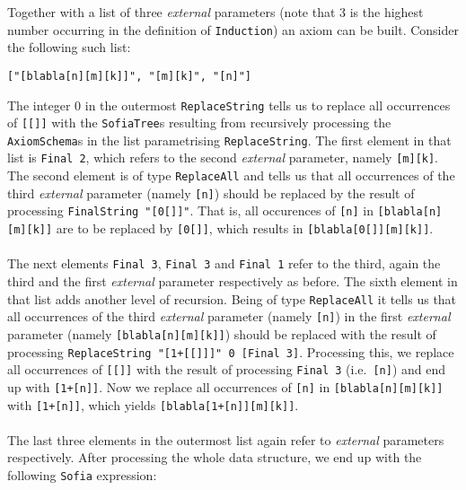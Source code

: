 \documentclass[notitlepage]{report}
\newcommand\m[1]{\texttt{#1}}
\begin{document}
Together with a list of three \emph{external} parameters (note that 3 is the
highest number occurring in the definition of \texttt{Induction}) an axiom can
be built. Consider the following such list:
\begin{verbatim}
["[blabla[n][m][k]]", "[m][k]", "[n]"]
\end{verbatim}

The integer 0 in the outermost \m{ReplaceString} tells us to replace all
occurrences of \texttt{[[]]} with the \m{SofiaTree}s resulting from recursively
processing the \m{AxiomSchema}s in the list parametrising \m{ReplaceString}. The
first element in that list is \m{Final 2}, which refers to the second
\emph{external} parameter, namely \texttt{[m][k]}. The second element is of type
\m{ReplaceAll} and tells us that all occurrences of the third \emph{external}
parameter (namely \texttt{[n]}) should be replaced by the result of processing
\m{FinalString "[0[]]"}. That is, all occurences of \texttt{[n]} in
\texttt{[blabla[n][m][k]]} are to be replaced by \texttt{[0[]]}, which results
in \texttt{[blabla[0[]][m][k]]}.
\\\\
The next elements \m{Final 3}, \m{Final 3} and \m{Final 1} refer to the
third, again the third and the first \emph{external} parameter respectively as
before. The sixth element in that list adds another level of recursion. Being of
type \m{ReplaceAll} it tells us that all occurrences of the third
\emph{external} parameter (namely \texttt{[n]}) in the first \emph{external}
parameter (namely \texttt{[blabla[n][m][k]]}) should be replaced with the result
of processing \m{ReplaceString "[1+[[]]]" 0 [Final 3]}. Processing this, we
replace all occurrences of \texttt{[[]]} with the result of processing
\m{Final 3} (i.e.\ \texttt{[n]}) and end up with \texttt{[1+[n]]}. Now we
replace all occurrences of \texttt{[n]} in \texttt{[blabla[n][m][k]]} with
\texttt{[1+[n]]}, which yields \texttt{[blabla[1+[n]][m][k]]}.
\\\\
The last three elements in the outermost list again refer to \emph{external}
parameters respectively. After processing the whole data structure, we end up
with the following \m{Sofia} expression:
\begin{quote}\vbox%
{\haddockverb\begin{verbatim}
[[m][k][blabla[n][m][k]][[n][[n]nat][blabla[n][m][k]]:[blabla[n][m][k]]]:
 [[n][[n]nat]:[blabla[n][m][k]]]] 
\end{verbatim}}
\end{quote}



\pagebreak
\begingroup
{}
\setlength\bibitemsep{10pt}
\printbibliography\
\endgroup
\end{document}
